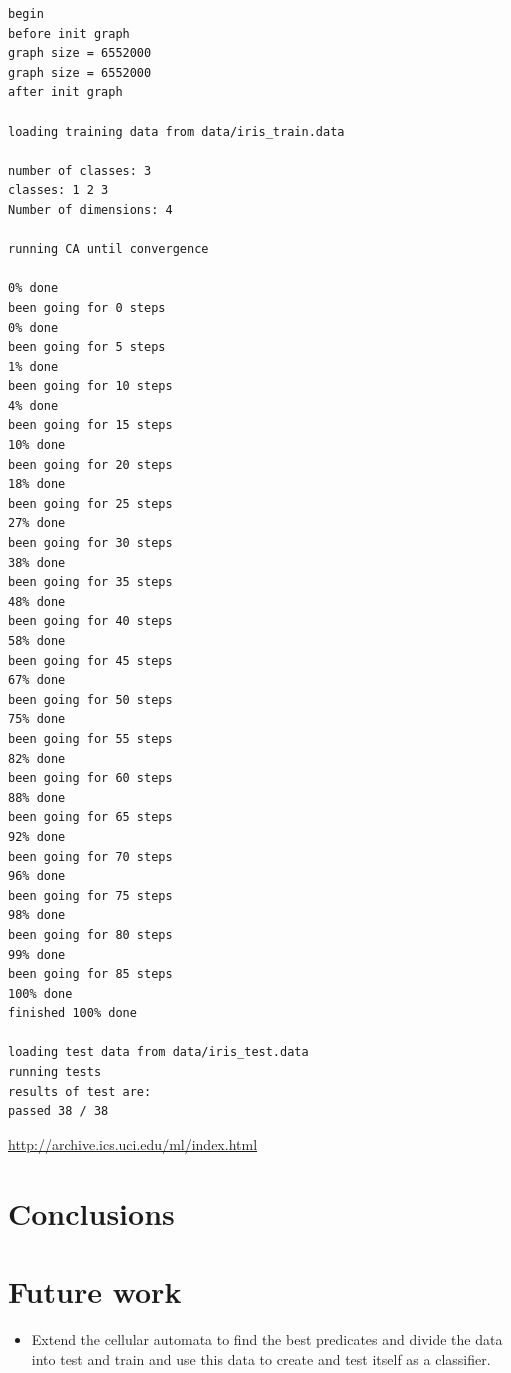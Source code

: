 \documentclass[11pt]{article}
\begin{document}
\begin{lstlisting}
begin
before init graph
graph size = 6552000
graph size = 6552000
after init graph

loading training data from data/iris_train.data

number of classes: 3
classes: 1 2 3 
Number of dimensions: 4

running CA until convergence

0% done
been going for 0 steps
0% done
been going for 5 steps
1% done
been going for 10 steps
4% done
been going for 15 steps
10% done
been going for 20 steps
18% done
been going for 25 steps
27% done
been going for 30 steps
38% done
been going for 35 steps
48% done
been going for 40 steps
58% done
been going for 45 steps
67% done
been going for 50 steps
75% done
been going for 55 steps
82% done
been going for 60 steps
88% done
been going for 65 steps
92% done
been going for 70 steps
96% done
been going for 75 steps
98% done
been going for 80 steps
99% done
been going for 85 steps
100% done
finished 100% done

loading test data from data/iris_test.data
running tests
results of test are:
passed 38 / 38
\end{lstlisting}
  \href{http://archive.ics.uci.edu/ml/index.html}{http://archive.ics.uci.edu/ml/index.html}
\section{Conclusions}
\label{sec-6}

  
\section{Future work}
\label{sec-7}


\begin{itemize}
\item Extend the cellular automata to find the best predicates and divide
   the data into test and train and use this data to create and test
   itself as a classifier.
\end{itemize}



\end{document}
